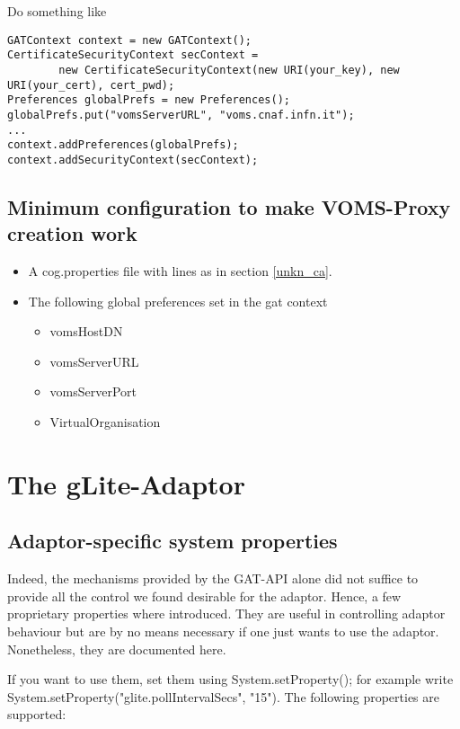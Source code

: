 \documentclass{scrreprt}
\begin{document}
Do something like

\begin{verbatim}
GATContext context = new GATContext();
CertificateSecurityContext secContext = 
		new CertificateSecurityContext(new URI(your_key), new URI(your_cert), cert_pwd);
Preferences globalPrefs = new Preferences();
globalPrefs.put("vomsServerURL", "voms.cnaf.infn.it");
...
context.addPreferences(globalPrefs);
context.addSecurityContext(secContext);
\end{verbatim}

\section{Minimum configuration to make VOMS-Proxy creation work}\label{min_voms_config}

\begin{itemize}
 \item A cog.properties file with lines as in section \ref{unkn_ca}.
 \item The following global preferences set in the gat context
 \begin{itemize}
  \item vomsHostDN
  \item vomsServerURL
  \item vomsServerPort
  \item VirtualOrganisation 
 \end{itemize}
\end{itemize}

\chapter{The gLite-Adaptor} 

\section{Adaptor-specific system properties}

Indeed, the mechanisms provided by the GAT-API alone did not suffice to provide all the control we found 
desirable for the adaptor. Hence, a few proprietary properties where introduced. They are useful
in controlling adaptor behaviour but are by no means necessary if one just wants to use the adaptor.
Nonetheless, they are documented here.
 
If you want to use them, set them using System.setProperty(); for example write 
System.setProperty("glite.pollIntervalSecs", "15").
The following properties are supported:
\end{document}

